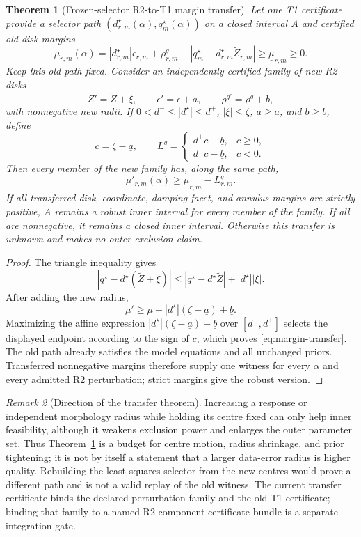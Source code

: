 \documentclass[11pt]{article}
\newtheorem{theorem}{Theorem}
\theoremstyle{definition}
\theoremstyle{remark}
\newtheorem{remark}[theorem]{Remark}
\begin{document}
\begin{theorem}[Frozen-selector R2-to-T1 margin transfer]
\label{thm:r2-t1-transfer}
Let one T1 certificate provide a selector path
\((d^\star_{r,m}(\alpha),q^\star_m(\alpha))\) on a closed interval \(A\)
and certified old disk margins
\[
 \mu_{r,m}(\alpha)=
 |d^\star_{r,m}|\epsilon_{r,m}+\rho^q_{r,m}
 -|q^\star_m-d^\star_{r,m}\widetilde Z_{r,m}|
 \ge\underline\mu_{r,m}\ge0.
\]
Keep this old path fixed.  Consider an independently certified family of new
R2 disks
\[
 \widetilde Z'=\widetilde Z+\xi,\qquad
 \epsilon'=\epsilon+a,\qquad
 \rho^{q\prime}=\rho^q+b,
\]
with nonnegative new radii.  If \(0<d^-\le|d^\star|\le d^+\),
\(|\xi|\le\zeta\), \(a\ge\underline a\), and
\(b\ge\underline b\), define
\[
 c=\zeta-\underline a,\qquad
 L^q=
 \begin{cases}
 d^+c-\underline b,&c\ge0,\\
 d^-c-\underline b,&c<0.
 \end{cases}
\]
Then every member of the new family has, along the same path,
\begin{equation}
 \mu'_{r,m}(\alpha)\ge
 \underline\mu_{r,m}-L^q_{r,m}.
 \label{eq:margin-transfer}
\end{equation}
If all transferred disk, coordinate, damping-facet, and annulus margins are
strictly positive, \(A\) remains a robust inner interval for every member of
the family.  If all are nonnegative, it remains a closed inner interval.
Otherwise this transfer is unknown and makes no outer-exclusion claim.
\end{theorem}
\begin{proof}
The triangle inequality gives
\[
 |q^\star-d^\star(\widetilde Z+\xi)|
 \le |q^\star-d^\star\widetilde Z|+|d^\star||\xi|.
\]
After adding the new radius,
\[
 \mu'\ge\mu-|d^\star|(\zeta-\underline a)+\underline b.
\]
Maximizing the affine expression
\(|d^\star|(\zeta-\underline a)-\underline b\) over
\([d^-,d^+]\) selects the displayed endpoint according to the sign of \(c\),
which proves \eqref{eq:margin-transfer}.  The old path already satisfies the
model equations and all unchanged priors.  Transferred nonnegative margins
therefore supply one witness for every \(\alpha\) and every admitted R2
perturbation; strict margins give the robust version.
\end{proof}

\begin{remark}[Direction of the transfer theorem]
Increasing a response or independent morphology radius while holding its
centre fixed can only help inner feasibility, although it weakens exclusion
power and enlarges the outer parameter set.  Thus
Theorem~\ref{thm:r2-t1-transfer} is a budget for centre motion, radius
shrinkage, and prior tightening; it is not by itself a statement that a
larger data-error radius is higher quality.  Rebuilding the least-squares
selector from the new centres would prove a different path and is not a valid
replay of the old witness.  The current transfer certificate binds the
declared perturbation family and the old T1 certificate; binding that family
to a named R2 component-certificate bundle is a separate integration gate.
\end{remark}
\end{document}
